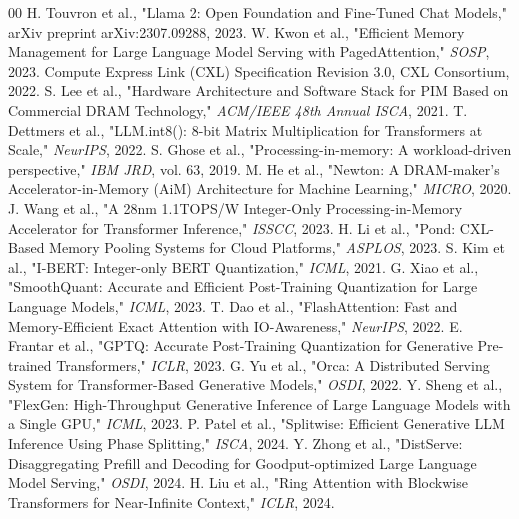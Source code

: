 \documentclass[10pt,conference]{IEEEtran}
\begin{document}
\begin{thebibliography}{00}
 H. Touvron et al., "Llama 2: Open Foundation and Fine-Tuned Chat Models," arXiv preprint arXiv:2307.09288, 2023.
 W. Kwon et al., "Efficient Memory Management for Large Language Model Serving with PagedAttention," \textit{SOSP}, 2023.
 Compute Express Link (CXL) Specification Revision 3.0, CXL Consortium, 2022.
 S. Lee et al., "Hardware Architecture and Software Stack for PIM Based on Commercial DRAM Technology," \textit{ACM/IEEE 48th Annual ISCA}, 2021.
 T. Dettmers et al., "LLM.int8(): 8-bit Matrix Multiplication for Transformers at Scale," \textit{NeurIPS}, 2022.
 S. Ghose et al., "Processing-in-memory: A workload-driven perspective," \textit{IBM JRD}, vol. 63, 2019.
 M. He et al., "Newton: A DRAM-maker's Accelerator-in-Memory (AiM) Architecture for Machine Learning," \textit{MICRO}, 2020.
 J. Wang et al., "A 28nm 1.1TOPS/W Integer-Only Processing-in-Memory Accelerator for Transformer Inference," \textit{ISSCC}, 2023.
 H. Li et al., "Pond: CXL-Based Memory Pooling Systems for Cloud Platforms," \textit{ASPLOS}, 2023.
 S. Kim et al., "I-BERT: Integer-only BERT Quantization," \textit{ICML}, 2021.
 G. Xiao et al., "SmoothQuant: Accurate and Efficient Post-Training Quantization for Large Language Models," \textit{ICML}, 2023.
 T. Dao et al., "FlashAttention: Fast and Memory-Efficient Exact Attention with IO-Awareness," \textit{NeurIPS}, 2022.
 E. Frantar et al., "GPTQ: Accurate Post-Training Quantization for Generative Pre-trained Transformers," \textit{ICLR}, 2023.
 G. Yu et al., "Orca: A Distributed Serving System for Transformer-Based Generative Models," \textit{OSDI}, 2022.
 Y. Sheng et al., "FlexGen: High-Throughput Generative Inference of Large Language Models with a Single GPU," \textit{ICML}, 2023.
 P. Patel et al., "Splitwise: Efficient Generative LLM Inference Using Phase Splitting," \textit{ISCA}, 2024.
 Y. Zhong et al., "DistServe: Disaggregating Prefill and Decoding for Goodput-optimized Large Language Model Serving," \textit{OSDI}, 2024.
 H. Liu et al., "Ring Attention with Blockwise Transformers for Near-Infinite Context," \textit{ICLR}, 2024.

\end{thebibliography}
\end{document}
